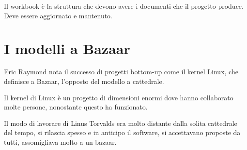 \documentclass[a4paper,12pt,titlepage,oneside]{book}
\begin{document}
Il workbook è la struttura che devono avere i documenti che il progetto produce. Deve essere aggiornato e mantenuto.

\chapter{I modelli a Bazaar}
Eric Raymond nota il successo di progetti bottom-up come il kernel Linux, che definisce a Bazaar, l'opposto del modello a cattedrale.

Il kernel di Linux è un progetto di dimensioni enormi dove hanno collaborato molte persone, nonostante questo ha funzionato.

Il modo di lavorare di Linus Torvalds era molto distante dalla solita cattedrale del tempo, si rilascia spesso e in anticipo il software, si accettavano proposte da tutti, assomigliava molto a un bazaar.
\end{document}
